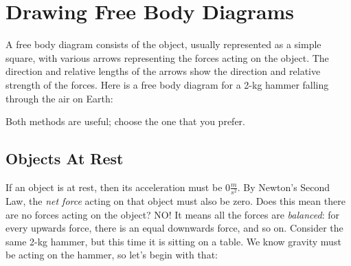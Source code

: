 
\section{Drawing Free Body Diagrams}

A free body diagram consists of the object, usually represented as a simple 
square, with various arrows representing the forces acting on the object. The 
direction and relative lengths of the arrows show the direction and relative 
strength of the forces. Here is a free body diagram for a 2-kg hammer falling 
through the air on Earth:

\begin{center}
\end{center}

Both methods are useful; choose the one that you prefer. 

\subsection{Objects At Rest}
If an object is at rest, then its acceleration must be $0 \frac{m}{s^2}$. By 
Newton's Second Law, the \textit{net force} acting on that object must also be 
zero. Does this mean there are no forces acting on the object? NO! It means all 
the forces are \textit{balanced}: for every upwards force, there is an equal 
downwards force, and so on. Consider the same 2-kg hammer, but this time it is 
sitting on a table. We know gravity must be acting on the hammer, so let's begin 
with that:

\begin{center}
\end{center}

